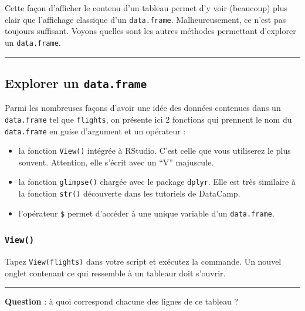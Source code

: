 \documentclass[a4paperpaper,]{article}
\providecommand{\tightlist}{%
  \setlength{\itemsep}{0pt}\setlength{\parskip}{0pt}}
\theoremstyle{definition}
\theoremstyle{definition}
\theoremstyle{definition}
\theoremstyle{remark}
\begin{document}
Cette façon d'afficher le contenu d'un tableau permet d'y voir
(beaucoup) plus clair que l'affichage classique d'un
\texttt{data.frame}. Malheureusement, ce n'est pas toujours suffisant.
Voyons quelles sont les autres méthodes permettant d'explorer un
\texttt{data.frame}.

\begin{center}\rule{0.5\linewidth}{\linethickness}\end{center}

\hypertarget{explorer-un-data.frame}{%
\subsection{\texorpdfstring{Explorer un
\texttt{data.frame}}{Explorer un data.frame}}\label{explorer-un-data.frame}}

Parmi les nombreuses façons d'avoir une idée des données contenues dans
un \texttt{data.frame} tel que \texttt{flights}, on présente ici 2
fonctions qui prennent le nom du \texttt{data.frame} en guise d'argument
et un opérateur :

\begin{itemize}
\tightlist
\item
  la fonction \texttt{View()} intégrée à RStudio. C'est celle que vous
  utiliserez le plus souvent. Attention, elle s'écrit avec un ``V''
  majuscule.
\item
  la fonction \texttt{glimpse()} chargée avec le package \texttt{dplyr}.
  Elle est très similaire à la fonction \texttt{str()} découverte dans
  les tutoriels de DataCamp.
\item
  l'opérateur \texttt{\$} permet d'accéder à une unique variable d'un
  \texttt{data.frame}.
\end{itemize}

\hypertarget{View}{%
\subsubsection{\texorpdfstring{\texttt{View()}}{View()}}\label{View}}

Tapez \texttt{View(flights)} dans votre script et exécutez la commande.
Un nouvel onglet contenant ce qui ressemble à un tableaur doit s'ouvrir.

\begin{center}\rule{0.5\linewidth}{\linethickness}\end{center}

\textbf{Question } : à quoi correspond chacune des lignes de ce tableau
?
\end{document}
